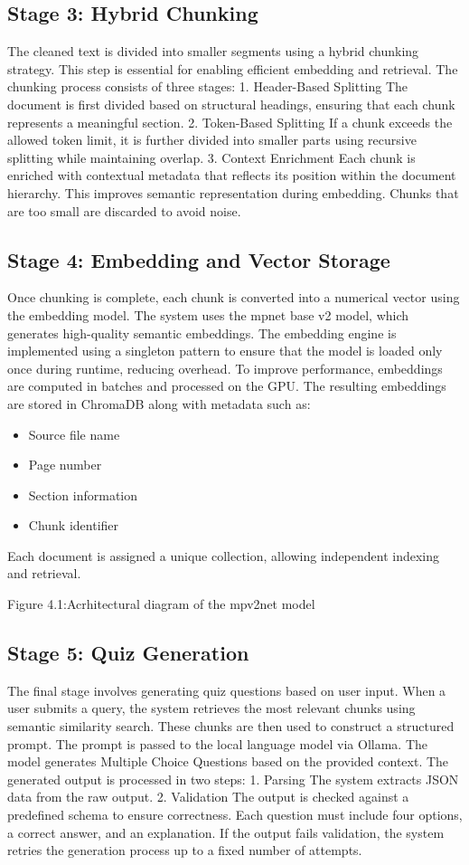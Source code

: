 \documentclass[12pt,a4paper]{report}
\begin{document}
\subsection{Stage 3: Hybrid Chunking}
The cleaned text is divided into smaller segments using a hybrid chunking strategy. This step is essential for enabling efficient embedding and retrieval.
The chunking process consists of three stages:
1. Header-Based Splitting
The document is first divided based on structural headings, ensuring that each chunk represents a meaningful section.
2. Token-Based Splitting
If a chunk exceeds the allowed token limit, it is further divided into smaller parts using recursive splitting while maintaining overlap.
3. Context Enrichment
Each chunk is enriched with contextual metadata that reflects its position within the document hierarchy. This improves semantic representation during embedding.
Chunks that are too small are discarded to avoid noise.
\subsection{Stage 4: Embedding and Vector Storage}
Once chunking is complete, each chunk is converted into a numerical vector using the embedding model.
The system uses the mpnet base v2 model, which generates high-quality semantic embeddings. The embedding engine is implemented using a singleton pattern to ensure that the model is loaded only once during runtime, reducing overhead.
To improve performance, embeddings are computed in batches and processed on the GPU.
The resulting embeddings are stored in ChromaDB along with metadata such as:
\begin{itemize}
\item Source file name
\item Page number
\item Section information
\item Chunk identifier
\end{itemize}
Each document is assigned a unique collection, allowing independent indexing and retrieval.








Figure 4.1:Acrhitectural diagram of the mpv2net model
\subsection{Stage 5: Quiz Generation}
The final stage involves generating quiz questions based on user input.
When a user submits a query, the system retrieves the most relevant chunks using semantic similarity search. These chunks are then used to construct a structured prompt.
The prompt is passed to the local language model via Ollama. The model generates Multiple Choice Questions based on the provided context.
The generated output is processed in two steps:
1. Parsing
The system extracts JSON data from the raw output.
2. Validation
The output is checked against a predefined schema to ensure correctness. Each question must include four options, a correct answer, and an explanation.
If the output fails validation, the system retries the generation process up to a fixed number of attempts.
\end{document}
